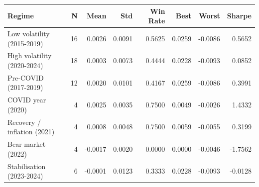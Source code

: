 \begin{tabular}{lrrrrrrr}
\toprule
Regime & N & Mean & Std & Win Rate & Best & Worst & Sharpe \\
\midrule
Low volatility (2015-2019) & 16 & 0.0026 & 0.0091 & 0.5625 & 0.0259 & -0.0086 & 0.5652 \\
High volatility (2020-2024) & 18 & 0.0003 & 0.0073 & 0.4444 & 0.0228 & -0.0093 & 0.0852 \\
Pre-COVID (2017-2019) & 12 & 0.0020 & 0.0101 & 0.4167 & 0.0259 & -0.0086 & 0.3991 \\
COVID year (2020) & 4 & 0.0025 & 0.0035 & 0.7500 & 0.0049 & -0.0026 & 1.4332 \\
Recovery / inflation (2021) & 4 & 0.0008 & 0.0048 & 0.7500 & 0.0059 & -0.0055 & 0.3199 \\
Bear market (2022) & 4 & -0.0017 & 0.0020 & 0.0000 & 0.0000 & -0.0046 & -1.7562 \\
Stabilisation (2023-2024) & 6 & -0.0001 & 0.0123 & 0.3333 & 0.0228 & -0.0093 & -0.0128 \\
\bottomrule
\end{tabular}
